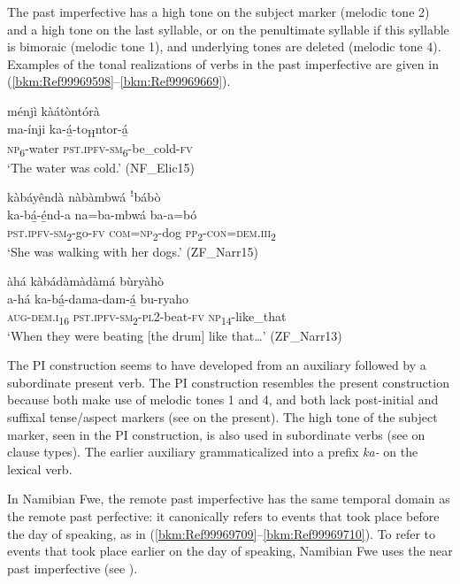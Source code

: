 The past imperfective has a high tone on the subject marker (melodic tone 2) and a high tone on the last syllable, or on the penultimate syllable if this syllable is bimoraic (melodic tone 1), and underlying tones are deleted (melodic tone 4). Examples of the tonal realizations of verbs in the past imperfective are given in (\ref{bkm:Ref99969598}--\ref{bkm:Ref99969669}).

\ea
\label{bkm:Ref99969598}
ménjì kàátòntórà\\
\gll ma-ínji  ka-á̲-to\textsubscript{H}ntor-á̲\\
\textsc{np}\textsubscript{6}-water  \textsc{pst}.\textsc{ipfv}-\textsc{sm}\textsubscript{6}-be\_cold-\textsc{fv}\\
\glt ‘The water was cold.’ (NF\_Elic15)
\z

\ea
kàbáyêndà nàbàmbwá ꜝbábò\\
\gll ka-bá̲-é̲nd-a    na=ba-mbwá    ba-a=bó\\
\textsc{pst}.\textsc{ipfv}-\textsc{sm}\textsubscript{2}-go-\textsc{fv}  \textsc{com}=\textsc{np}\textsubscript{2}-dog  \textsc{pp}\textsubscript{2}-\textsc{con}=\textsc{dem}.\textsc{iii}\textsubscript{2}\\
\glt ‘She was walking with her dogs.’ (ZF\_Narr15)
\z

\ea
\label{bkm:Ref99969669}
àhá kàbádàmàdàmá bùryàhò\\
\gll a-há    ka-bá̲-dama-dam-á̲    bu-ryaho\\
\textsc{aug}-\textsc{dem}.\textsc{i}\textsubscript{16}  \textsc{pst}.\textsc{ipfv}-\textsc{sm}\textsubscript{2}-\textsc{pl}2-beat-\textsc{fv}  \textsc{np}\textsubscript{14}-like\_that\\
\glt ‘When they were beating [the drum] like that…’ (ZF\_Narr13)
\z

The PI construction seems to have developed from an auxiliary followed by a subordinate present verb. The PI construction resembles the present construction because both make use of melodic tones 1 and 4, and both lack post-initial and suffixal tense/aspect markers (see  on the present). The high tone of the subject marker, seen in the PI construction, is also used in subordinate verbs (see  on clause types). The earlier auxiliary grammaticalized into a prefix \textit{ka-} on the lexical verb.

In Namibian Fwe, the remote past imperfective has the same temporal domain as the remote past perfective: it canonically refers to events that took place before the day of speaking, as in (\ref{bkm:Ref99969709}--\ref{bkm:Ref99969710}). To refer to events that took place earlier on the day of speaking, Namibian Fwe uses the near past imperfective (see ).

